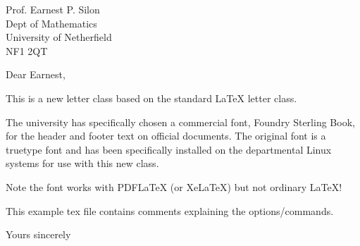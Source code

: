 \documentclass{oxmathletter} %
\begin{document}
\begin{letter}{
Prof. Earnest P. Silon \\  
Dept of Mathematics\\
University of Netherfield\\
NF1 2QT}

\subject{Departmental \LaTeX{} Letter Class similar to Word Version}  

\opening{Dear Earnest,}  %

This is a new letter class based on the standard \LaTeX{} letter class.

The university has specifically chosen a commercial font, Foundry Sterling
Book, for the header and footer text on official documents. The original font
is a truetype font and has been specifically installed on the departmental
Linux systems for use with this new class.

Note the font works with PDF\LaTeX{} (or Xe\LaTeX) but not ordinary \LaTeX!

This example tex file contains comments explaining the options/commands.

\closing{Yours sincerely} %
\end{letter}
\end{document}
